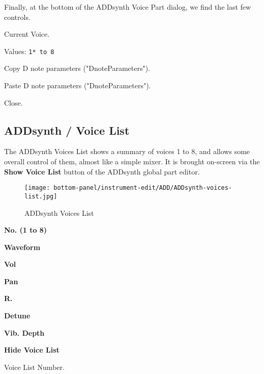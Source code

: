    Finally, at the bottom of the ADDsynth Voice Part dialog, we find the
   last few controls.

   \setcounter{ItemCounter}{0}      %

   Current Voice.

   Values: \texttt{1* to 8}

   Copy D note parameters ("DnoteParameters").

   Paste D note parameters ("DnoteParameters").

   Close.

\subsection{ADDsynth / Voice List}
\label{subsec:addsynth_voice_list}

   The ADDsynth Voices List shows a summary of voices 1 to 8, and allows
   some overall control of them, almost like a simple mixer.
   It is brought on-screen via the \textbf{Show Voice List} button
   of the ADDsynth global part editor.

\begin{figure}[H]
   \centering 
   \texttt{[image: bottom-panel/instrument-edit/ADD/ADDsynth-voices-list.jpg]}
   \caption{ADDsynth Voices List}
   \label{fig:addsynth_voices_list}
\end{figure}

   \begin{enumber}
      \item \textbf{No. (1 to 8)}
      \item \textbf{Waveform}
      \item \textbf{Vol}
      \item \textbf{Pan}
      \item \textbf{R.}
      \item \textbf{Detune}
      \item \textbf{Vib. Depth}
      \item \textbf{Hide Voice List}
   \end{enumber}

   \setcounter{ItemCounter}{0}      %

   Voice List Number.


